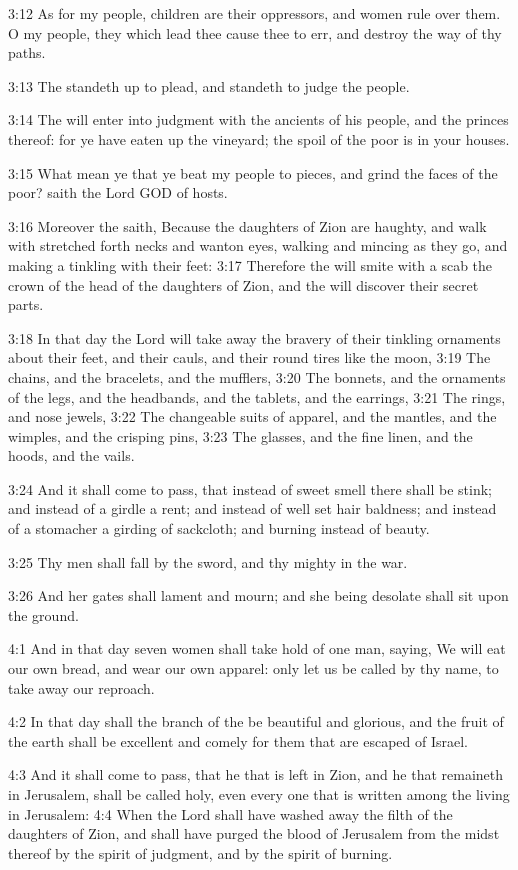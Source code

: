 3:12 As for my people, children are their oppressors, and women rule over them. O my people, they which lead thee cause thee to err, and destroy the way of thy paths.

3:13 The \LORD standeth up to plead, and standeth to judge the people.

3:14 The \LORD will enter into judgment with the ancients of his people, and the princes thereof: for ye have eaten up the vineyard; the spoil of the poor is in your houses.

3:15 What mean ye that ye beat my people to pieces, and grind the faces of the poor? saith the Lord GOD of hosts.

3:16 Moreover the \LORD saith, Because the daughters of Zion are haughty, and walk with stretched forth necks and wanton eyes, walking and mincing as they go, and making a tinkling with their feet: 3:17 Therefore the \LORD will smite with a scab the crown of the head of the daughters of Zion, and the \LORD will discover their secret parts.

3:18 In that day the Lord will take away the bravery of their tinkling ornaments about their feet, and their cauls, and their round tires like the moon, 3:19 The chains, and the bracelets, and the mufflers, 3:20 The bonnets, and the ornaments of the legs, and the headbands, and the tablets, and the earrings, 3:21 The rings, and nose jewels, 3:22 The changeable suits of apparel, and the mantles, and the wimples, and the crisping pins, 3:23 The glasses, and the fine linen, and the hoods, and the vails.

3:24 And it shall come to pass, that instead of sweet smell there shall be stink; and instead of a girdle a rent; and instead of well set hair baldness; and instead of a stomacher a girding of sackcloth; and burning instead of beauty.

3:25 Thy men shall fall by the sword, and thy mighty in the war.

3:26 And her gates shall lament and mourn; and she being desolate shall sit upon the ground.

4:1 And in that day seven women shall take hold of one man, saying, We will eat our own bread, and wear our own apparel: only let us be called by thy name, to take away our reproach.

4:2 In that day shall the branch of the \LORD be beautiful and glorious, and the fruit of the earth shall be excellent and comely for them that are escaped of Israel.

4:3 And it shall come to pass, that he that is left in Zion, and he that remaineth in Jerusalem, shall be called holy, even every one that is written among the living in Jerusalem: 4:4 When the Lord shall have washed away the filth of the daughters of Zion, and shall have purged the blood of Jerusalem from the midst thereof by the spirit of judgment, and by the spirit of burning.


